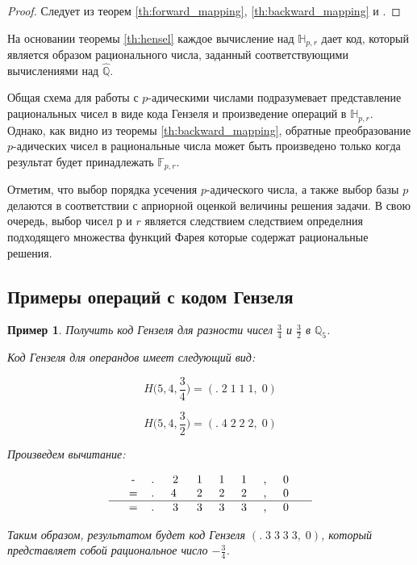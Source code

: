 \documentclass[master, och, diploma, times]{sty/SCWorks}
\theoremstyle{plain}
\newtheorem{exmp}{Пример}[section]
\theoremstyle{definition}
\numberwithin{equation}{section}
\begin{document}
\begin{proof}
Следует из теорем \ref{th:forward_mapping}, \ref{th:backward_mapping} и \cite{bib:numbers:krishnamurthy}.
\end{proof}

На основании теоремы \ref{th:hensel} каждое вычисление над $\mathbb{H}_{p,r}$ дает код, который является образом рационального числа, заданный соответствующими вычислениями над $\hat{\mathbb{Q}}$.


Общая схема для работы с $p$-адическими числами подразумевает представление рациональных чисел в виде кода Гензеля и произведение операций в $\mathbb{H}_{p,r}$. Однако, как видно из теоремы \ref{th:backward_mapping}, обратные преобразование $p$-адических чисел в рациональные числа может быть произведено только когда результат будет принадлежать $\mathbb{F}_{p,r}$.

Отметим, что выбор порядка усечения $p$-адического числа, а также выбор базы $p$ делаются в соответствии с априорной оценкой величины решения задачи. В свою очередь, выбор чисел $р$ и $r$ является следствием следствием определния подходящего множества функций Фарея которые содержат рациональные решения.

\subsection{Примеры операций с кодом Гензеля}

\begin{exmp}
Получить код Гензеля для разности чисел $\frac{3}{4}$ и $\frac{3}{2}$ в $\mathbb{Q}_5$.

\noindent Код Гензеля для операндов имеет следующий вид:

$$H\bigg(5,4, \frac{3}{4}\bigg)=(.\; 2\; 1\; 1\; 1,\; 0)$$

$$H\bigg(5,4, \frac{3}{2}\bigg)=(.\; 4\; 2\; 2\; 2,\; 0)$$


\noindent Произведем вычитание:

$$
\begin{tabular}{ccccccccccc}
& - & .\; & 2\; & 1\; & 1\; & 1\; & ,\; & 0\; &  \\
& = & .\; & 4 \; & 2\; & 2\; & 2\; & ,\; & 0\; &  \\
\hline
& = & .\; & 3\; & 3\; & 3\; & 3\; & ,\; & 0\; &
\end{tabular}
$$


\noindent Таким образом, результатом будет код Гензеля $(.\; 3\; 3\; 3\; 3,\; 0)$, который представляет собой рациональное число $-\frac{3}{4}$.
\end{exmp}
\end{document}

